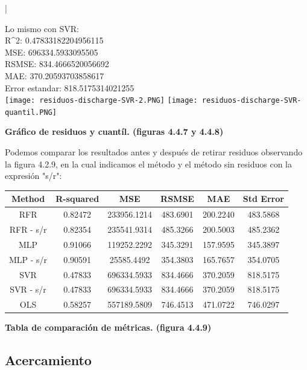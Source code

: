 |\documentclass{article}
\begin{document}
Lo mismo con SVR:\\

        {R^2}:  0.47833182204956115\\
        MSE:  696334.5933095505\\
        RSMSE:  834.4666520056692\\
        MAE:  370.20593703858617\\
        Error estandar:  818.5175314021255\\


        \texttt{[image: residuos-discharge-SVR-2.PNG]} 
        \texttt{[image: residuos-discharge-SVR-quantil.PNG]}
        \begin{center}
            \textbf{Gráfico de residuos y cuantíl. (figuras 4.4.7 y 4.4.8)}
        \end{center}

Podemos comparar los resultados antes y después de retirar residuos observando la figura 4.2.9, en la cual indicamos el método y el método sin residuos con la expresión "s/r":\\

\begin{tabular}{|c|c|c|c|c|c|}
    \hline
    Method  &   R-squared  & MSE & RSMSE & MAE & Std Error  \\
    \hline
    RFR & 0.82472 & 233956.1214 & 483.6901 & 200.2240 &   483.5868\\
    \hline
    RFR - s/r  & 0.82354 & 235541.9314 & 485.3266 & 200.5003 &  485.2362\\
    \hline
    MLP & 0.91066 & 119252.2292 & 345.3291 & 157.9595 & 345.3897 \\
    \hline
    MLP - s/r & 0.90591 & 25585.4492 & 354.3803 & 165.7657 & 354.0705 \\
    \hline
    SVR & 0.47833 & 696334.5933 & 834.4666 & 370.2059 & 818.5175 \\
    \hline
    SVR - s/r & 0.47833 & 696334.5933 & 834.4666 & 370.2059 & 818.5175 \\
    \hline
    OLS & 0.58257 & 557189.5809 & 746.4513 & 471.0722 & 746.0297 \\
    \hline

\end{tabular}

\begin{center}
            \textbf{Tabla de comparación de métricas. (figura 4.4.9)}
\end{center}

\subsection{Acercamiento}
\end{document}
